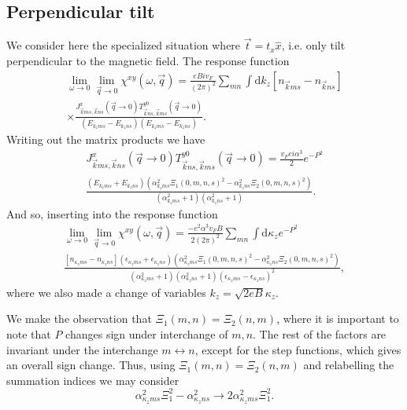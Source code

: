 \subsection{Perpendicular tilt}
\label{sec:perptiltsum}
We consider here the specialized situation where \( \vec{t} = t_x \hat{x} \), i.e. only tilt perpendicular to the magnetic field.
The response function
\begin{multline*}
  \lim_{\omega \to 0} \lim_{\vec{q} \to 0} \chi^{xy}(\omega, \vec{q}) =
  \frac{e B i v_F}{(2 \pi)^2}
  \sum\limits_{mn}^{} \int \mathrm{d}k_z [n_{\vec{k} m s} - n_{\vec{k} n s}]\\
  \times \frac{
    J^x_{\vec{k} m s, \vec{k} ns} (\vec{q}\to 0) T^{y 0}_{\vec{k} n s, \vec{k}ms}(\vec{q} \to 0)
  }{
    (E_{k_z m s} - E_{k_z ns})(E_{k_z m s}-E_{k_z ns})
  }.
\end{multline*}
Writing out the matrix products we have
\begin{multline}
  J^x_{\vec{k} m s, \vec{k} ns} (\vec{q} \to 0) T^{y 0}_{\vec{k} n s, \vec{k}ms}(\vec{q} \to 0)
  =
  \frac{v_F e i \alpha^{3}}{2}
  e^{-P^2}\\
  \frac{
    (E_{k_{z} m s} + E_{k_z n s})
    (\alpha_{k_z m s}^2 \Xi_1(0, m,n, s)^2 - \alpha_{k_z n s}^2 \Xi_2(0, m,n, s)^2)
  }{
    (\alpha_{k_z m s}^2 + 1)(\alpha_{k_z n s}^2 + 1)
  }.
  \label{eq:114}
\end{multline}
And so, inserting into the response function
\begin{multline}
  \label{eq:115}
  \lim_{\omega \to 0} \lim_{\vec{q} \to 0} \chi^{xy}(\omega, \vec{q}) =
  \frac{- e^2 \alpha^3 v_F B }{2 (2 \pi)^2 }
  \sum\limits_{mn}^{}
  \int \mathrm{d}\kappa_z
  e^{-P^2}\\
  \frac{
    [n_{\kappa_z m s} - n_{\kappa_z n s}]
    (\epsilon_{\kappa_z m s} + \epsilon_{\kappa_z n s})
    (\alpha_{\kappa_z m s}^2 \Xi_1(0, m,n, s)^2 - \alpha_{\kappa_z n s}^2 \Xi_2(0, m,n, s)^2)
  }{
    (\alpha_{\kappa_z m s}^2 + 1)(\alpha_{\kappa_z n s}^2 + 1)
    (\epsilon_{\kappa_z m s} - \epsilon_{\kappa_z ns})^2
  },
\end{multline}
where we also made a change of variables \( k_z = \sqrt{2 e B} \kappa_z \).

We make the observation that \( \Xi _1(m, n) = \Xi _2(n, m) \), where it is important to note that \( P \) changes sign under interchange of \( m,n \).
The rest of the factors are invariant under the interchange \( m \leftrightarrow n \), except for the step functions, which gives an overall sign change.
Thus, using \( \Xi _1(m, n) = \Xi _2(n, m) \) and relabelling the summation indices we may consider
\[
  \alpha_{\kappa_z m s}^2 \Xi_1^2 - \alpha_{\kappa_z n s}^2 \to 2 \alpha_{\kappa_z m s}^2 \Xi_1^2.
\]

